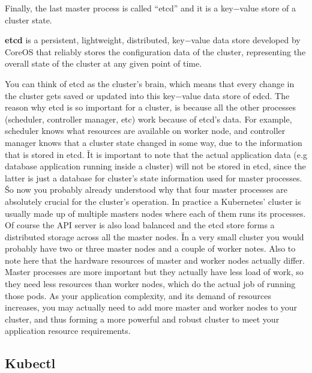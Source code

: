 Finally, the last master process is called ``etcd'' and it is a key$-$value store of a cluster state. 

\bd[etcd]
\textbf{etcd} is a persistent, lightweight, distributed, key$-$value data store developed by CoreOS that reliably
stores the configuration data of the cluster, representing the overall state of the cluster at any given point of
time.
\ed


You can think of etcd as the cluster's brain, which means that every change in the cluster gets saved or updated into
this key$-$value data store of edcd. The reason why etcd is so important for a cluster, is because all the other
processes (scheduler, controller manager, etc) work because of etcd's data. For example, scheduler knows what
resources are available on worker node, and controller manager knows that a cluster state changed in some way, due to
the information that is stored in etcd. \v

It is important to note that the actual application data (e.g database application running inside a cluster) will not
be stored in etcd, since the latter is just a database for cluster's state information used for master processes. \v

So now you probably already understood why that four master processes are absolutely crucial for the cluster's
operation. In practice a Kubernetes' cluster is usually made up of multiple masters nodes where each of them runs its
processes. Of course the API server is also load balanced and the etcd store forms a distributed storage across all
the master nodes. \v

In a very small cluster you would probably have two or three master nodes and a couple of worker notes. Also to note
here that the hardware resources of master and worker nodes actually differ. Master processes are more important but
they actually have less load of work, so they need less resources than worker nodes, which do the actual job of
running those pods. As your application complexity, and its demand of resources increases, you may actually need to
add more master and worker nodes to your cluster, and thus forming a more powerful and robust cluster to meet your
application resource requirements.


\subsection{Kubectl}

